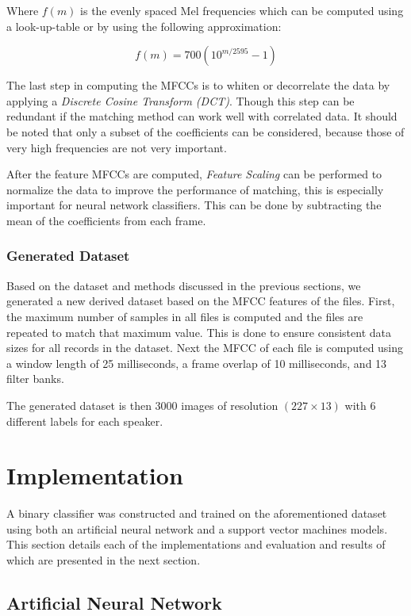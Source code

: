 \documentclass[twocolumn]{article}
\begin{document}
Where $f(m)$ is the evenly spaced Mel frequencies which can be computed using a
look-up-table or by using the following approximation:

\begin{equation}
f(m) = 700(10^{m / 2595} - 1)
\end{equation}

The last step in computing the MFCCs is to whiten or decorrelate the data by
applying a \emph{Discrete Cosine Transform (DCT)}. Though this step can be
redundant if the matching method can work well with correlated data. It should
be noted that only a subset of the coefficients can be considered, because
those of very high frequencies are not very important.

After the feature MFCCs are computed, \emph{Feature Scaling} can be performed
to normalize the data to improve the performance of matching, this is
especially important for neural network classifiers. This can be done by
subtracting the mean of the coefficients from each frame.

\subsubsection{Generated Dataset}

Based on the dataset and methods discussed in the previous sections, we
generated a new derived dataset based on the MFCC features of the files.
First, the maximum number of samples in all files is computed and the files are
repeated to match that maximum value. This is done to ensure consistent data
sizes for all records in the dataset. Next the MFCC of each file is computed
using a window length of 25 milliseconds, a frame overlap of 10 milliseconds,
and 13 filter banks.

The generated dataset is then 3000 images of resolution $(227 \times 13)$ with 6
different labels for each speaker.

\section{Implementation}
\label{sec:Implementation}

A binary classifier was constructed and trained on the aforementioned dataset
using both an artificial neural network and a support vector machines models.
This section details each of the implementations and evaluation and results of
which are presented in the next section.

\subsection{Artificial Neural Network}
\end{document}
